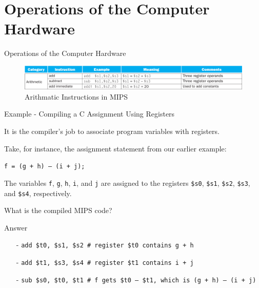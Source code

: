 \section{Operations of the Computer Hardware}
\begin{frame}{Operations of the Computer Hardware}
\begin{figure}\caption{Arithmatic Instructions in MIPS}
\begin{center}
\includegraphics[width=\textwidth, height=0.2\textheight]{docs/images/operations-1}
\end{center}
\end{figure}
\end{frame}

\begin{frame}{Example - Compiling a C Assignment Using Registers}
\begin{flushleft}
It is the compiler’s job to associate program variables with registers. 

Take, for instance, the assignment statement from our earlier example:

\hspace{8mm}\texttt{f = (g + h) – (i + j);}

The variables \texttt{f}, \texttt{g}, \texttt{h}, \texttt{i}, and \texttt{j} are assigned to the registers \texttt{\$s0}, \texttt{\$s1}, \texttt{\$s2}, \texttt{\$s3},
and \texttt{\$s4}, respectively. 

What is the compiled MIPS code?
\end{flushleft}
\end{frame}

\begin{frame}[fragile]{Answer}
\begin{itemize}
\item[-]
\texttt{add \$t0, \$s1, \$s2  \# register \$t0 contains g + h}

\item[-]
\texttt{add \$t1, \$s3, \$s4  \# register \$t1 contains i + j}

\item[-]
\texttt{sub \$s0, \$t0, \$t1  \# f gets \$t0 – \$t1, which is (g + h) – (i + j)}
\end{itemize}
\end{frame}

